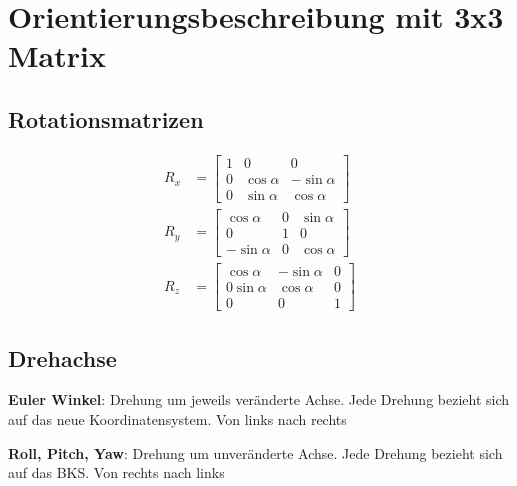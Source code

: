 \section{Orientierungsbeschreibung mit 3x3 Matrix}
\subsection{Rotationsmatrizen}
\begin{align}
    R_x &= \begin{bmatrix} 1 & 0 & 0  \\ 0 &\cos \alpha& -\sin\alpha \\ 0 & \sin\alpha & \cos\alpha \end{bmatrix}\\
    R_y &= \begin{bmatrix} \cos\alpha & 0 & \sin\alpha  \\ 0 & 1 & 0 \\ -\sin\alpha & 0 & \cos\alpha \end{bmatrix}\\
    R_z &= \begin{bmatrix} \cos \alpha& -\sin\alpha& 0 \\ 0 \sin\alpha & \cos\alpha & 0 \\ 0 & 0 & 1 \end{bmatrix}
\end{align}

\subsection{Drehachse}
\begin{compactitem}
    \item \textbf{Euler Winkel}: Drehung um jeweils veränderte Achse. Jede Drehung bezieht sich auf
    das neue Koordinatensystem. Von links nach rechts
    \item \textbf{Roll, Pitch, Yaw}: Drehung um unveränderte Achse. Jede Drehung bezieht sich auf
    das BKS. Von rechts nach links
\end{compactitem}

